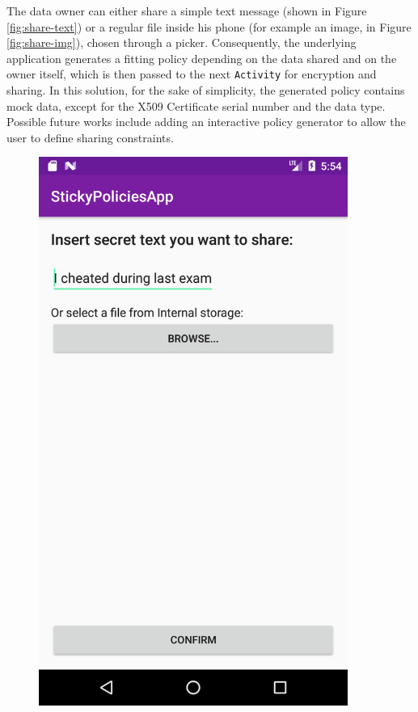 The data owner can either share a simple text message (shown in Figure \ref{fig:share-text}) or a regular file inside his phone (for example an image, in Figure \ref{fig:share-img}), chosen through a picker. Consequently, the underlying application generates a fitting policy depending on the data shared and on the owner itself, which is then passed to the next \texttt{Activity} for encryption and sharing. In this solution, for the sake of simplicity, the generated policy contains mock data, except for the X509 Certificate serial number and the data type. Possible future works include adding an interactive policy generator to allow the user to define sharing constraints.
\begin{figure}
	\centering
	\begin{minipage}{0.35\textwidth}
		\centering
		\includegraphics[width=0.9\textwidth]{ShareData-text.png} %

\end{minipage}
\end{figure}
